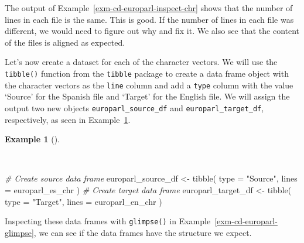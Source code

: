 \documentclass[
  letterpaper,
  DIV=11,
  numbers=noendperiod]{scrreprt}
\newenvironment{Shaded}{\begin{snugshade}}{\end{snugshade}}
\newcommand{\AttributeTok}[1]{\textcolor[rgb]{0.00,0.00,0.00}{#1}}
\newcommand{\CommentTok}[1]{\textcolor[rgb]{0.00,0.00,0.00}{\textit{#1}}}
\newcommand{\FunctionTok}[1]{\textcolor[rgb]{0.00,0.00,0.00}{#1}}
\newcommand{\NormalTok}[1]{\textcolor[rgb]{0.00,0.00,0.00}{#1}}
\newcommand{\OtherTok}[1]{\textcolor[rgb]{0.00,0.00,0.00}{#1}}
\newcommand{\StringTok}[1]{\textcolor[rgb]{0.00,0.00,0.00}{#1}}
\theoremstyle{definition}
\newtheorem{example}{Example}[chapter]
\theoremstyle{remark}
\begin{document}
The output of Example~\ref{exm-cd-europarl-inspect-chr} shows that the
number of lines in each file is the same. This is good. If the number of
lines in each file was different, we would need to figure out why and
fix it. We also see that the content of the files is aligned as
expected.

Let's now create a dataset for each of the character vectors. We will
use the \texttt{tibble()} function from the \texttt{tibble} package to
create a data frame object with the character vectors as the
\texttt{line} column and add a \texttt{type} column with the value
`Source' for the Spanish file and `Target' for the English file. We will
assign the output two new objects \texttt{europarl\_source\_df} and
\texttt{europarl\_target\_df}, respectively, as seen in
Example~\ref{exm-cd-europarl-df}.

\begin{example}[]\protect\hypertarget{exm-cd-europarl-df}{}\label{exm-cd-europarl-df}

~

\begin{Shaded}
\begin{Highlighting}[]
\CommentTok{\# Create source data frame}
\NormalTok{europarl\_source\_df }\OtherTok{\textless{}{-}}
  \FunctionTok{tibble}\NormalTok{(}
    \AttributeTok{type =} \StringTok{"Source"}\NormalTok{,}
    \AttributeTok{lines =}\NormalTok{ europarl\_es\_chr}
\NormalTok{  )}
\CommentTok{\# Create target data frame}
\NormalTok{europarl\_target\_df }\OtherTok{\textless{}{-}}
  \FunctionTok{tibble}\NormalTok{(}
    \AttributeTok{type =} \StringTok{"Target"}\NormalTok{,}
    \AttributeTok{lines =}\NormalTok{ europarl\_en\_chr}
\NormalTok{  )}
\end{Highlighting}
\end{Shaded}

\end{example}

Inspecting these data frames with \texttt{glimpse()} in
Example~\ref{exm-cd-europarl-glimpse}, we can see if the data frames
have the structure we expect.
\end{document}

